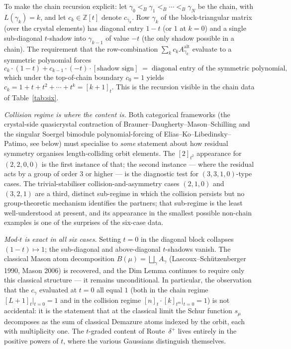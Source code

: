 \documentclass[11pt]{article}
\theoremstyle{definition}
\theoremstyle{remark}
\newcommand{\Aalt}{A^{\mathrm{alt}}}
\newcommand{\ZZ}{\mathbb{Z}}
\newcommand{\qint}[1]{[#1]_t}
\begin{document}
To make the chain recursion explicit: let
$\gamma_0 <_B \gamma_1 <_B \cdots <_B \gamma_N$ be the chain, with
$L(\gamma_k) = k$, and let $c_k \in \ZZ[t]$ denote $c_{\gamma_k}$.
Row $\gamma_k$ of the block-triangular matrix (over the crystal
elements) has diagonal entry $1 - t$ (or $1$ at $k = 0$) and a
single sub-diagonal $t$-shadow into $\gamma_{k-1}$ of value $-t$
(the only shadow possible in a chain). The requirement that the
row-combination $\sum_k c_k \Aalt_{\gamma_k}$ evaluate to a
symmetric polynomial forces
\[
   c_k \cdot (1 - t) + c_{k-1} \cdot (-t) \cdot [\text{shadow sign}]
     \;=\; \text{diagonal entry of the symmetric polynomial},
\]
which under the top-of-chain boundary $c_0 = 1$ yields
$c_k = 1 + t + t^2 + \cdots + t^k = \qint{k+1}$. This is the
recursion visible in the chain data of Table~\ref{tab:six}.

\emph{Collision regime is where the content is.} Both categorical
frameworks (the crystal-side quasicrystal contraction of
Brauner--Daugherty--Mason--Schilling and the singular Soergel
bimodule polynomial-forcing of Elias--Ko--Libedinsky--Patimo, see
below) must specialise to \emph{some} statement about how residual
symmetry organises length-colliding orbit elements. The
$[2]_{t^2}$ appearance for $(2,2,0,0)$ is the first instance of
that; the second instance --- where the residual acts by a group
of order $3$ or higher --- is the diagnostic test for
$(3,3,1,0)$-type cases. The trivial-stabiliser
collision-and-asymmetry cases $(2,1,0)$ and $(3,2,1)$ are a
third, distinct sub-regime in which the collision persists but
no group-theoretic mechanism identifies the partners; that
sub-regime is the least well-understood at present, and its
appearance in the smallest possible non-chain examples is one of
the surprises of the six-case data.

\emph{Mod-$t$ is exact in all six cases.} Setting $t = 0$ in the
diagonal block collapses $(1-t) \mapsto 1$; the sub-diagonal and
above-diagonal $t$-shadows vanish. The classical Mason atom
decomposition $B(\mu) = \bigsqcup_\gamma A_\gamma$
(Lascoux--Sch\"utzenberger 1990, Mason 2006) is recovered, and the
Dim Lemma continues to require only this classical structure ---
it remains unconditional. In particular, the observation that the
$c_\gamma$ evaluated at $t = 0$ all equal $1$ (both in the chain
regime $\qint{L+1}|_{t=0} = 1$ and in the collision regime
$\qint{n} \cdot [k]_{t^m}|_{t=0} = 1$) is not accidental: it is
the statement that at the classical limit the Schur function
$s_\mu$ decomposes as the sum of classical Demazure atoms indexed
by the orbit, each with multiplicity one. The $t$-graded content
of Route~$\delta^+$ lives entirely in the positive powers of $t$,
where the various Gaussians distinguish themselves.
\end{document}
